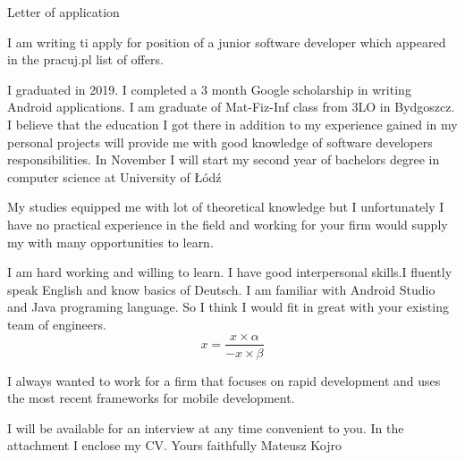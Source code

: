 \documentclass{article}
\begin{document}
{\LARGE Letter of application}
\newline


I am writing ti apply for position of a junior software developer which appeared in the pracuj.pl list of offers.


I graduated in 2019. I completed a 3 month Google scholarship in writing Android applications. I am graduate of Mat-Fiz-Inf class from 3LO in Bydgoszcz. I believe that the education I got there in addition to my experience gained in my personal projects will provide me with good knowledge of software developers responsibilities. In November I will start my second year of bachelors degree in computer science at University of Łódź


My studies equipped me with lot of theoretical knowledge but I unfortunately I have no practical experience in the field and working for your firm would supply my with many opportunities to learn.


I am hard working and willing to learn. I have good interpersonal skills.I fluently speak English and know basics of Deutsch. I am familiar with Android Studio and Java programing language. So I think I would fit in great with your existing team of engineers. 
\begin{equation}
    x = \frac{x\times\alpha}{-x\times\beta} 
\end{equation}

I always wanted to work for a firm that focuses on rapid development and uses the most recent frameworks for mobile development.


I will be available for an interview at any time convenient to you. In the attachment I enclose my CV.
\newline
\newline
Yours faithfully
\newline
Mateusz Kojro
\end{document}
